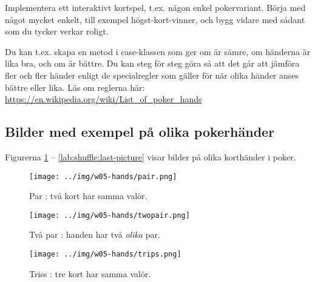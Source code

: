 \Task Implementera ett interaktivt kortspel, t.ex. någon enkel pokervariant. Börja med något mycket enkelt, till exempel högst-kort-vinner, och bygg vidare med sådant som du tycker verkar roligt.

Du kan t.ex. skapa en metod  i case-klassen  som ger  om  är sämre,  om händerna är lika bra, och  om  är bättre. Du kan steg för steg göra så att det går att jämföra fler och fler händer enligt de specialregler som gäller för när olika händer anses bättre eller lika. Läs om reglerna här: \url{https://en.wikipedia.org/wiki/List_of_poker_hands}


\subsection{Bilder med exempel på olika pokerhänder}\label{shuffle:hands}

Figurerna \ref{lab:shuffle:first-picture} -- \ref{lab:shuffle:last-picture} visar bilder på olika korthänder i poker.

\newcommand{\CardWidth}{0.45\textwidth}
\newcommand{\CardCaptionWidth}{0.5\textwidth}

\begin{figure}[H]
 \begin{minipage}[c]{\CardWidth}
  \texttt{[image: ../img/w05-hands/pair.png]}
 \end{minipage}\hfill
 \begin{minipage}[c]{\CardCaptionWidth}
  \caption{Par : två kort har samma valör.}
   \label{lab:shuffle:first-picture}
 \end{minipage}
\end{figure}

\begin{figure}[H]
 \begin{minipage}[c]{\CardWidth}
  \texttt{[image: ../img/w05-hands/twopair.png]}
 \end{minipage}\hfill
 \begin{minipage}[c]{\CardCaptionWidth}
  \caption{Två par : handen har två \emph{olika} par.}
 \end{minipage}
\end{figure}

\begin{figure}[H]
 \begin{minipage}[c]{\CardWidth}
  \texttt{[image: ../img/w05-hands/trips.png]}
 \end{minipage}\hfill
 \begin{minipage}[c]{\CardCaptionWidth}
  \caption{Triss : tre kort har samma valör.}
 \end{minipage}
\end{figure}

